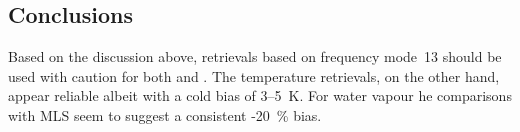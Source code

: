 \subsection{Conclusions}
\label{sec:fm13:conclusions}
Based on the discussion above, retrievals based on frequency mode~13 should be
used with caution for both  and . The temperature
retrievals, on the other hand, appear reliable albeit with a cold bias of
3--5~K. For water vapour he comparisons with MLS seem to suggest a consistent
-20~\% bias.
